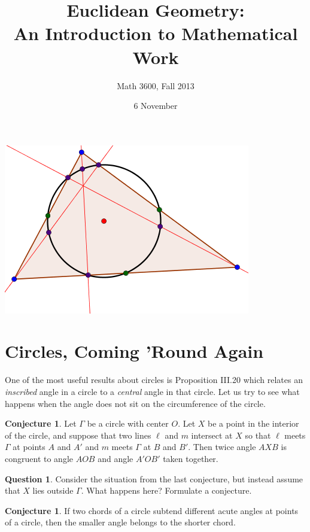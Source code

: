 \documentclass{tufte-handout}
\title{Euclidean Geometry:\\An Introduction to Mathematical Work}
\author[]{Math 3600, Fall 2013}
\date{6 November}
\theoremstyle{definition}
\newtheorem{conjecture}[problem]{Conjecture}
\newtheorem{question}[problem]{Question}
\begin{document}
\maketitle

\begin{marginfigure}
    \includegraphics{NPC}
\end{marginfigure}

\setcounter{section}{10}
\section{Circles, Coming 'Round Again}
One of the most useful results about circles is Proposition III.20 which relates an \emph{inscribed} angle in a circle to a \emph{central} angle in that circle.
Let us try to see what happens when the angle does not sit on the circumference of the circle.

\begin{conjecture}
Let $\Gamma$ be a circle with center $O$. Let $X$ be a point in the interior of the circle, and suppose that two lines $\ell$ and $m$ intersect at $X$ so that $\ell$ meets $\Gamma$ at points $A$ and $A'$ and $m$ meets $\Gamma$ at $B$ and $B'$.
Then twice angle $AXB$ is congruent to angle $AOB$ and angle $A'OB'$ taken together.
\end{conjecture}

\begin{question}
Consider the situation from the last conjecture, but instead assume that $X$ lies outside $\Gamma$. What happens here? Formulate a conjecture.
\end{question}


\begin{conjecture}
If two chords of a circle subtend different acute angles at points of a circle, then the smaller angle belongs to the shorter chord.
\end{conjecture}
\end{document}
